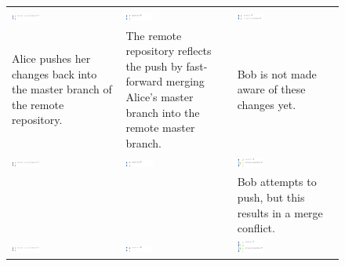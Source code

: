 \begin{figure}[htbp]
\begin{tabulary}{\textwidth}{LLL}
    \includegraphics[width=0.27\textwidth]{Figures/background/foxtrot/alice_3.png} &
    \includegraphics[width=0.27\textwidth]{Figures/background/foxtrot/origin_2.png} &
    \includegraphics[width=0.27\textwidth]{Figures/background/foxtrot/bob_2.png} \\

    \tiny{Alice pushes her changes back into the master branch of the remote
    repository.} &
    \tiny{The remote repository reflects the push by fast-forward merging
    Alice's master branch into the remote master branch.} &
    \tiny{Bob is not made aware of these changes yet.} \\\hline

    \includegraphics[width=0.27\textwidth]{Figures/background/foxtrot/alice_3.png} &
    \includegraphics[width=0.27\textwidth]{Figures/background/foxtrot/origin_2.png} &
    \includegraphics[width=0.27\textwidth]{Figures/background/foxtrot/bob_3.png} \\

    &
    &
    \tiny{Bob attempts to push, but this results in a merge conflict.}
    \\\hline

    \includegraphics[width=0.27\textwidth]{Figures/background/foxtrot/alice_3.png} &
    \includegraphics[width=0.27\textwidth]{Figures/background/foxtrot/origin_2.png} &
    \includegraphics[width=0.27\textwidth]{Figures/background/foxtrot/bob_4.png} \\


\end{tabulary}
\end{figure}
